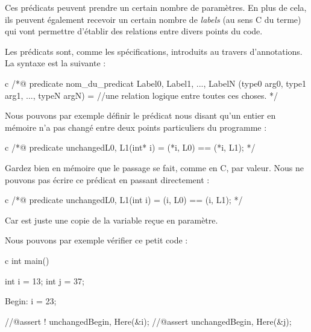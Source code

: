 \documentclass[middle]{zmdocument}
\begin{document}
Ces prédicats peuvent prendre un certain nombre de paramètres. En plus de cela,
ils peuvent également recevoir un certain nombre de \textit{labels} (au sens C du terme) 
qui vont permettre d'établir des relations entre divers points du code.





Les prédicats sont, comme les spécifications, introduits au travers 
d'annotations. La syntaxe est la suivante :



\begin{CodeBlock}{c}
/*@
  predicate nom_du_predicat { Label0, Label1, ..., LabelN }(type0 arg0, type1 arg1, ..., typeN argN) =
    //une relation logique entre toutes ces choses.
*/
\end{CodeBlock}



Nous pouvons par exemple définir le prédicat nous disant qu'un entier en mémoire n'a
pas changé entre deux points particuliers du programme :



\begin{CodeBlock}{c}
/*@
  predicate unchanged{L0, L1}(int* i) =
    \at(*i, L0) == \at(*i, L1);
*/
\end{CodeBlock}



\begin{Warning}
Gardez bien en mémoire que le passage se fait, comme en C, par valeur. Nous ne
pouvons pas écrire ce prédicat en passant directement  :

\begin{CodeBlock}{c}
/*@
  predicate unchanged{L0, L1}(int i) =
    \at(i, L0) == \at(i, L1);
 */
\end{CodeBlock}

Car  est juste une copie de la variable reçue en paramètre.
\end{Warning}


Nous pouvons par exemple vérifier ce petit code :



\begin{CodeBlock}{c}
int main(){
  int i = 13;
  int j = 37;

 Begin:
  i = 23;
 
  //@assert ! unchanged{Begin, Here}(&i);
  //@assert   unchanged{Begin, Here}(&j);
}
\end{CodeBlock}
\end{document}

